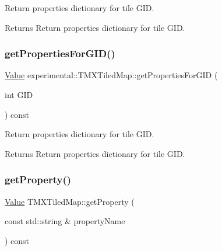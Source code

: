 Return properties dictionary for tile G\+ID.

\begin{DoxyReturn}{Returns}
Return properties dictionary for tile G\+ID. 
\end{DoxyReturn}
\mbox{\label{classexperimental_1_1TMXTiledMap_a0cf03d2887243f2ac3c25e6d1102e1c0}} 
\subsubsection{\texorpdfstring{get\+Properties\+For\+G\+I\+D()}{getPropertiesForGID()}\hspace{0.1cm}{\footnotesize\ttfamily [2/2]}}
{\footnotesize\ttfamily \hyperlink{classValue}{Value} experimental\+::\+T\+M\+X\+Tiled\+Map\+::get\+Properties\+For\+G\+ID (\begin{DoxyParamCaption}\item[{int}]{G\+ID }\end{DoxyParamCaption}) const}

Return properties dictionary for tile G\+ID.

\begin{DoxyReturn}{Returns}
Return properties dictionary for tile G\+ID. 
\end{DoxyReturn}
\mbox{\label{classexperimental_1_1TMXTiledMap_a4628b8ea7514e6f12e292b68f8e808ae}} 
\subsubsection{\texorpdfstring{get\+Property()}{getProperty()}\hspace{0.1cm}{\footnotesize\ttfamily [1/2]}}
{\footnotesize\ttfamily \hyperlink{classValue}{Value} T\+M\+X\+Tiled\+Map\+::get\+Property (\begin{DoxyParamCaption}\item[{const std\+::string \&}]{property\+Name }\end{DoxyParamCaption}) const}

